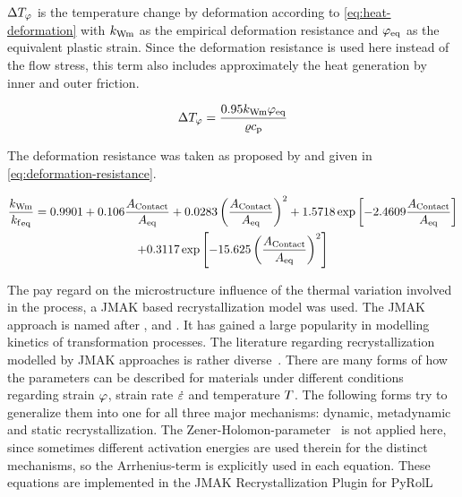 \noindent$\Delta{T}_{{\varphi}}$ is the temperature change by deformation according to \autoref{eq:heat-deformation} with ${k_\mathrm{Wm}}$ as the empirical deformation resistance and ${{{\varphi}}_\mathrm{eq}}$ as the equivalent plastic strain.
Since the deformation resistance is used here instead of the flow stress, this term also includes approximately the heat generation by inner and outer friction.

\begin{equation}
    \Delta{T}_{{\varphi}} = \frac{\num{0.95} {k_\mathrm{Wm}} {{{\varphi}}_\mathrm{eq}}}{{\varrho}{c_\mathrm{p}}}
    \label{eq:heat-deformation}
\end{equation}

The deformation resistance was taken as proposed by \textcite{Hensel1978} and given in \autoref{eq:deformation-resistance}.

\begin{multline}
    \frac{{k_\mathrm{Wm}}}{{{{k_\mathrm{f}}}_\mathrm{eq}}} = \num{0.9901} + \num{0.106} \frac{{{A}_\mathrm{Contact}}}{{{{A}}_\mathrm{eq}}} + \num{0.0283} \left( \frac{{{A}_\mathrm{Contact}}}{{{{A}}_\mathrm{eq}}} \right)^2 + \num{1.5718} \exp \left[ \num{-2.4609} \frac{{{A}_\mathrm{Contact}}}{{{{A}}_\mathrm{eq}}} \right] \\
    + \num{0.3117} \exp \left[ \num{-15.625} \left( \frac{{{A}_\mathrm{Contact}}}{{{{A}}_\mathrm{eq}}} \right)^2 \right]
    \label{eq:deformation-resistance}
\end{multline}

The pay regard on the microstructure influence of the thermal variation involved in the process, a JMAK based recrystallization model was used.
The JMAK approach is named after \textcite{Johnson1939}, \textcite{Avrami1939, Avrami1940, Avrami1941} and \textcite{Kolmogorov1937}.
It has gained a large popularity in modelling kinetics of transformation processes.
The literature regarding recrystallization modelled by JMAK approaches is rather diverse~\cite{Luton1969, Sellars1978, Sellars1979, Sellars1985, Beynon1992, Glover1972, Glover1973, Hodgson1992, Laasraoui1991, Laasraoui1991a, Hernandez1996, Medina1996, Fernandez2000, Fernandez2003, Karhausen1992,Roberts1979, Maccagno1996, Siciliano2000}.
There are many forms of how the parameters can be described for materials under different conditions regarding strain ${\varphi}$, strain rate ${\dot{\varepsilon}}$ and temperature ${T}$.
The following forms try to generalize them into one for all three major mechanisms: dynamic, metadynamic and static recrystallization.
The Zener-Holomon-parameter~\cite{Zener1944} is not applied here, since sometimes different activation energies are used therein for the distinct mechanisms, so the Arrhenius-term is explicitly used in each equation.
These equations are implemented in the JMAK Recrystallization Plugin for PyRolL~\cite{pyroll-jmak-recrystallization}

